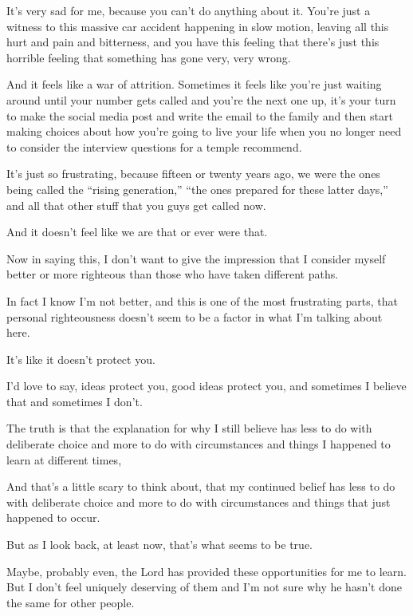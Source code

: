 \begin{compactitem}
\begin{compactitem}
					\item It's very sad for me, because you can't do anything about it. You're just a witness to this massive car accident happening in slow motion, leaving all this hurt and pain and bitterness, and you have this feeling that there's just this horrible feeling that something has gone very, very wrong.
					\item And it feels like a war of attrition. Sometimes it feels like you're just waiting around until your number gets called and you're the next one up, it's your turn to make the social media post and write the email to the family and then start making choices about how you're going to live your life when you no longer need to consider the interview questions for a temple recommend.
					\item It's just so frustrating, because fifteen or twenty years ago, we were the ones being called the ``rising generation,'' ``the ones prepared for these latter days,'' and all that other stuff that you guys get called now.
					\item And it doesn't feel like we are that or ever were that.
					\item Now in saying this, I don't want to give the impression that I consider myself better or more righteous than those who have taken different paths.
					\item In fact I know I'm not better, and this is one of the most frustrating parts, that personal righteousness doesn't seem to be a factor in what I'm talking about here.
					\item It's like it doesn't protect you.
					\item I'd love to say, ideas protect you, good ideas protect you, and sometimes I believe that and sometimes I don't.
					\item The truth is that the explanation for why I still believe has less to do with deliberate choice and more to do with circumstances and things I happened to learn at different times,
					\item And that's a little scary to think about, that my continued belief has less to do with deliberate choice and more to do with circumstances and things that just happened to occur.
					\item But as I look back, at least now, that's what seems to be true.
					\item Maybe, probably even, the Lord has provided these opportunities for me to learn. But I don't feel uniquely deserving of them and I'm not sure why he hasn't done the same for other people.
				\end{compactitem}
				

\end{compactitem}
